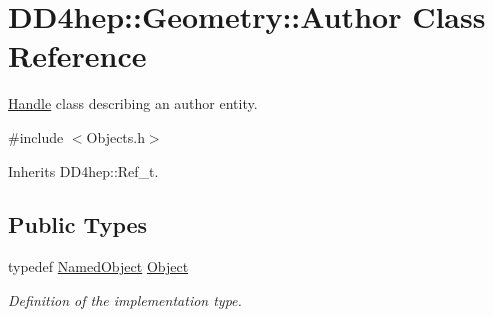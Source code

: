 \hypertarget{class_d_d4hep_1_1_geometry_1_1_author}{
\section{DD4hep::Geometry::Author Class Reference}
\label{class_d_d4hep_1_1_geometry_1_1_author}
}


\hyperlink{class_d_d4hep_1_1_handle}{Handle} class describing an author entity.  


{\ttfamily \#include $<$Objects.h$>$}

Inherits DD4hep::Ref\_\-t.\subsection*{Public Types}
\begin{DoxyCompactItemize}
\item 
typedef \hyperlink{class_d_d4hep_1_1_named_object}{NamedObject} \hyperlink{class_d_d4hep_1_1_geometry_1_1_author_a253185ac4c6734b22d0b2f6b8161bf11}{Object}
\begin{DoxyCompactList}\small\item\em Definition of the implementation type. \item\end{DoxyCompactList}\end{DoxyCompactItemize}
